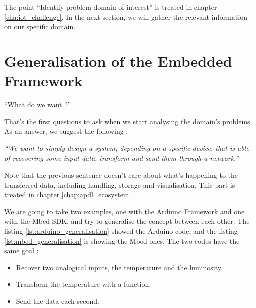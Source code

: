 The point ``Identify problem domain of interest'' is treated in chapter
\ref{cha:iot_challenge}. In the next section, we will gather the relevant information on our
specific domain.

\section{Generalisation of the Embedded Framework}
\label{sec:generalisation_framework}

``What do we want ?''

That's the first questions to ask when we start analysing the domain's problems.
As an answer, we suggest the following :

{ \Large \textit{``We want to simply design a system, depending on a specific
    device, that is able of recovering some input data, transform and
    send them through a network.''}
}

Note that the previous sentence doesn't care about what's happening to the
transferred data, including handling, storage and visualisation. This part is
treated in chapter \ref{chap:apdl_ecosystem}.

We are going to take two examples, one with the Arduino Framework and one with
the Mbed SDK, and try to generalise the concept between each other. The listing
\ref{lst:arduino_generalisation} showed the Arduino code, and the listing
\ref{lst:mbed_generalisation} is showing the Mbed ones. The two codes have the
same goal :

\begin{itemize}
\item Recover two analogical inputs, the temperature and the luminosity.
\item Transform the temperature with a function.
\item Send the data each second.
\end{itemize}

